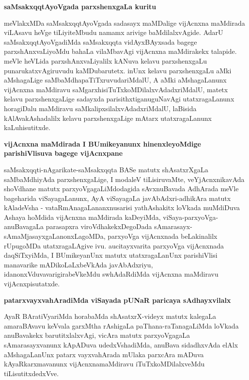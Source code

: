 {\bigskip
\noindent
{\large\bf saMsakxqqtAyoVgada parxshenxgaLa kuritu}}\label{page29}
\medskip

\noindent
meVlakxMDa saMsakxqqtAyoVgada sadasayx maMDalige vijAcnxna maMdirada viLAsavu heVge tiLiyiteMbudu \-namamx arivige baMdilalxvAgide. AdarU saMsakxqqtAyoVgadiMda saMsakxqqta vidAyxBAyxsada bagege parxshAnxvaLi\-yoMdu bahaLa vilaMbavAgi vijAcnxna maMdirakekx talapide. meVle heVLida parxshAnxvaLiyalilx kANuva kelavu parxshenx\-gaLu punarukatx\-vAgiruvudu kaMDubarutetx. inUnx kelavu parxshenx\-gaLu aMki aMshagaLige saMbaMdha\-paTiTxru\-vuda\-riMdalU, A aMki aMshagaLanunx vijAcnxna maMdiravu saMgarxhisiTuTx\break\-koMDilalxvAdadxriMdalU, matetx kelavu parxshenxgaLige sadayxda parisithxtiganuguNavAgi utatxra\-gaLanunx horagiDalu maMdiravu saMkalipxsilalxvAdadx\-riMdalU, laBisida kAlAvakAsha\-dalilx kelavu parxshenxgaLige mAtarx utatxragaLanunx kaLuhisutitxde.

{\bigskip
\noindent
{\large\bf vijAcnxna maMdirada I BUmikeyanunx hinenxleyoMdige parishiVlisuva bagege vijAcnxpane}}\label{page29a}
\medskip

\noindent
saMsakxqqti-nAgarikate-saMsakxqqta BASe matutx shAsatxrXgaLa saMbaMdhiyAda parxshenxgaLige, I modaleV tiLisiru\-vaMte, veYjAcnxnikavAda shoVdhane matutx parxyoVgagaLiMdodagida sAvxnuBavada AdhArada meVle bage\-harida viSayagaLanunx, AyA viSayagaLa javA\-bAdxri-adhikAra matutx kAladeVsha - vataRmAnagaLananxnusarisi \-yathA\-shakitx loVkada muMdiDuva Ashaya hoMdida vijAcnxna maMdirada kaDeyiMda, viSaya-parxyoVga-\-anuBava\-gaLa parasapxra viroVdhakekxDegoDada sAmarasayx-sAmaMjasayxgaLanonxLagoMDa, parxyoVga vijAcnxnada beLaki\-nalilx rUpugoMDa utatxragaLAgive ivu. aucitayxvarita parxyoVga vijAcnxnada daqSiTxyiMda, I BUmike\-yanUnx matutx utatxragaLanUnx pari\-shiVlisi manavarike mADikoLaLxbeVkAda javAbAdxriyu, idanonxVdu\-vavari\-gira\break\-beVkeMdu swhAdaRdiMda vijAcnxna maMdiravu vijAcnxpisutatxde.

{\bigskip
\noindent
{\large\bf patarxvayxvahAradiMda viSayada pUNaR paricaya sAdhayxvilalx}}\label{page30}
\medskip

\noindent
AyaR BAratiVyariMda horabaMda shAsatxrX-videyx matutx kalegaLa amaraBAvavu keVvala garxMtha rAshi\-gaLa paThana-raTanagaLiMda loVkada anuBavakekx barutitxlalxvAgi, vicAra matutx parxyoVgagaLa sAma\-rasayx\-vanunx kApA\-Duva udedxVshadiMda, anuBava sidadhxvAda elAlx aMshagaLanUnx patarx vayxvahArada mUlaka parxcAra \-mADuva kAyaRkarxmavanunx vijAcnxnamaMdiravu iTuTxkoMDilalxveMdu tiLisutitxdedxVve.

